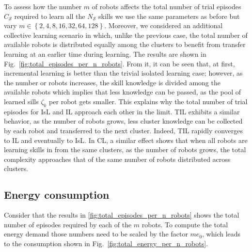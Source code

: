 To assess how the number $m$ of robots affects the total number of trial episodes $C_\mathcal{S}$ required to learn all the $N_\mathcal{S}$ skills we use the same parameters as before but vary $m \in \left \lbrace 2,4,8,16,32,64,128\right \rbrace$. Moreover, we considered an additional collective learning scenario in which, unlike the previous case, the total number of available robots is distributed equally among the clusters to benefit from transfer learning at an earlier time during learning. The results are shown in Fig.~\ref{fig:total_episodes_per_n_robots}. From it, it can be seen that, at first, incremental learning is better than the trivial isolated learning case; however, as the number or robots increases, the skill knowledge is divided among the available robots which implies that less knowledge can be passed, as the pool of learned sills $\zeta_k$ per robot gets smaller. This explains why the total number of trial episodes for IsL and IL approach each other in the limit. TIL exhibits a similar behavior, as the number of robots grows, less cluster knowledge can be collected by each robot and transferred to the next cluster. Indeed, TIL rapidly converges to IL and eventually to IsL. In CL, a similar effect shows that when all robots are learning skills in from the same clusters, as the number of robots grows, the total complexity approaches that of the same number of robots distributed across clusters.


\subsection{Energy consumption}
Consider that the results in \ref{fig:total_episodes_per_n_robots} shows the total number of episodes required by each of the $m$ robots. To compute the total energy demand those numbers need to be scaled by the factor $m e_0$, which leads to the consumption shown in Fig.~\ref{fig:total_energy_per_n_robots}.

